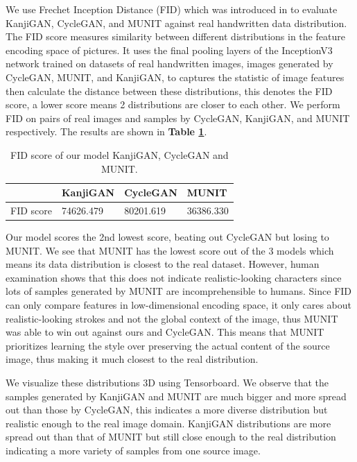 \documentclass[12pt]{report}
\begin{document}
We use Frechet Inception Distance (FID) which was introduced in \cite{fid} to evaluate KanjiGAN, CycleGAN, and MUNIT against real handwritten data distribution. The FID score measures similarity between different distributions in the feature encoding space of pictures. It uses the final pooling layers of the InceptionV3 network trained on datasets of real handwritten images, images generated by CycleGAN, MUNIT, and KanjiGAN, to captures the statistic of image features then calculate the distance between these distributions, this denotes the FID score, a lower score means 2 distributions are closer to each other. We perform FID on pairs of real images and samples by CycleGAN, KanjiGAN, and MUNIT respectively. The results are shown in \textbf{Table \ref{tbl:fid}}.

\begin{table}[h]
	\centering
	\caption{FID score of our model KanjiGAN, CycleGAN and MUNIT.}
	\label{tbl:fid}
	\begin{tabular}{|l|l|l|l|}
		\hline
		\textbf{} & \textbf{KanjiGAN} & \textbf{CycleGAN} & \textbf{MUNIT}       \\ \hline
		FID score	&74626.479               & 80201.619        & 36386.330              \\ \hline
	\end{tabular}
\end{table}

Our model scores the 2nd lowest score, beating out CycleGAN but losing to MUNIT. We see that MUNIT has the lowest score out of the 3 models which means its data distribution is closest to the real dataset. However, human examination shows that this does not indicate realistic-looking characters since lots of samples generated by MUNIT are incomprehensible to humans. Since FID can only compare features in low-dimensional encoding space, it only cares about realistic-looking strokes and not the global context of the image, thus MUNIT was able to win out against ours and CycleGAN. This means that MUNIT prioritizes learning the style over preserving the actual content of the source image, thus making it much closest to the real distribution.

We visualize these distributions 3D using Tensorboard. We observe that the samples generated by KanjiGAN and MUNIT are much bigger and more spread out than those by CycleGAN, this indicates a more diverse distribution but realistic enough to the real image domain. KanjiGAN distributions are more spread out than that of MUNIT but still close enough to the real distribution indicating a more variety of samples from one source image.
\end{document}
